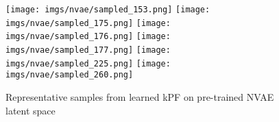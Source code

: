 
\begin{figure*}[t]
    \centering
    \texttt{[image: imgs/nvae/sampled\_153.png]}
    \texttt{[image: imgs/nvae/sampled\_175.png]}
    \texttt{[image: imgs/nvae/sampled\_176.png]}
    \texttt{[image: imgs/nvae/sampled\_177.png]}
    \texttt{[image: imgs/nvae/sampled\_225.png]}
    \texttt{[image: imgs/nvae/sampled\_260.png]}
    \vspace{-8pt}
    \caption{Representative samples from learned kPF on pre-trained NVAE latent space}
    \vspace{-1em}
    \label{fig:nvae}
\end{figure*}



